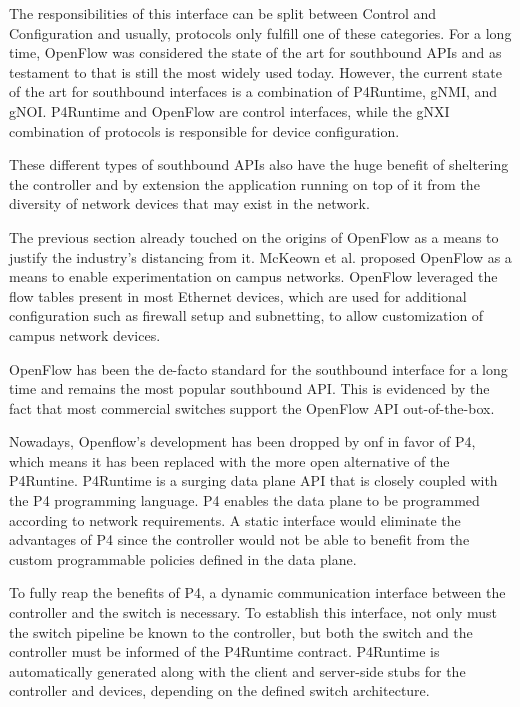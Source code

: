 The responsibilities of this interface can be split between Control and Configuration\cite{peterson_software-defined_2021} and usually, protocols only fulfill one of these categories. For a long time, OpenFlow was considered the state of the art for southbound APIs and as testament to that is still the most widely used today\cite{latif_comprehensive_2020}. However, the current state of the art for southbound interfaces is a combination of P4Runtime, gNMI, and gNOI. P4Runtime and OpenFlow are control interfaces, while the gNXI combination of protocols is responsible for device configuration\cite{peterson_software-defined_2021}.

These different types of southbound APIs also have the huge benefit of sheltering the controller and by extension the application running on top of it from the diversity of network devices that may exist in the network. \cite{peterson_software-defined_2021}

The previous section already touched on the origins of OpenFlow as a means to justify the industry's distancing from it. McKeown et al. proposed OpenFlow\cite{mckeown_openflow_2008} as a means to enable experimentation on campus networks. OpenFlow leveraged the flow tables present in most Ethernet devices, which are used for additional configuration such as firewall setup and subnetting, to allow customization of campus network devices. \cite{xia_survey_2015}

OpenFlow has been the de-facto standard for the southbound interface for a long time\cite{nunes_survey_2014} and remains the most popular southbound API. This is evidenced by the fact that most commercial switches support the OpenFlow API out-of-the-box\cite{kreutz_software-defined_2015}.

Nowadays, Openflow's development has been dropped by \gls{onf} in favor of P4, which means it has been replaced with the more open alternative of the P4Runtine. P4Runtime is a surging data plane API\cite{hauser_survey_2021} that is closely coupled with the P4 programming language. P4 enables the data plane to be programmed according to network requirements. A static interface would eliminate the advantages of P4 since the controller would not be able to benefit from the custom programmable policies defined in the data plane. 

To fully reap the benefits of P4, a dynamic communication interface between the controller and the switch is necessary\cite{peterson_software-defined_2021}. To establish this interface, not only must the switch pipeline be known to the controller, but both the switch and the controller must be informed of the P4Runtime contract. P4Runtime is automatically generated along with the client and server-side stubs for the controller and devices, depending on the defined switch architecture\cite{peterson_software-defined_2021}.

